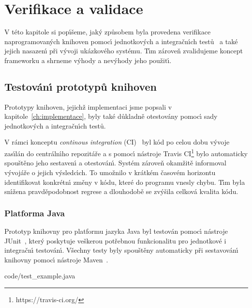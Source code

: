 

\chapter{Verifikace a validace}\label{ch:verifikace}

V této kapitole si pop\'{\i}šeme, jak\'y způsobem byla provedena
verifikace naprogramovan\'ych knihoven pomoc\'{\i}
jednotkov\'ych a integračn\'{\i}ch testů~\cite{luo2001software}
a také jejich nasazen\'{\i} při v\'yvoji ukázkového systému.
T\'{\i}m zároveň zvalidujeme koncept frameworku a shrneme v\'yhody
a nev\'yhody jeho použit\'{\i}.

\section{Testován\'{\i} prototypů knihoven}

Prototypy knihoven, jejichž implementaci jsme popsali
v kapitole~\ref{ch:implementace}, byly také důkladně
otestovány pomoc\'{\i} sady jednotkov\'ych a integračn\'{\i}ch testů.

V rámci konceptu \textit{continous integration} (\gls{CI})~\cite{fowler2006continuous}
byl kód po celou dobu v\'yvoje zas\'{\i}lán do centráln\'{\i}ho repozitáře
a s pomoc\'{\i} nástroje Travis \gls{CI}\footnote{https://travis-ci.org/}
bylo automaticky spouštěno jeho sestaven\'{\i} a otestován\'{\i}. Systém
zároveň okamžitě informoval v\'yvojáře o jejich v\'ysledc\'{\i}ch. To
umožnilo v krátkém časovém horizontu identifikovat konkrétn\'{\i} změny
v kódu, které do programu vnesly chybu. T\'{\i}m byla sn\'{\i}žena
pravděpodobnost regrese a dlouhodobě se zv\'yšila celková kvalita kódu.

\subsection{Platforma Java}

Prototyp knihovny pro platformu jazyka Java byl testován pomoc\'{\i}
nástroje JUnit~\cite{junit4}, kter\'y poskytuje veškerou potřebnou funkcionalitu pro
jednotkové i integračn\'{\i} testován\'{\i}. Všechny testy byly spouštěny automaticky
při sestavován\'{\i} knihovny pomoc\'{\i} nástroje Maven~\cite{maven}.


{code/test_example.java}

